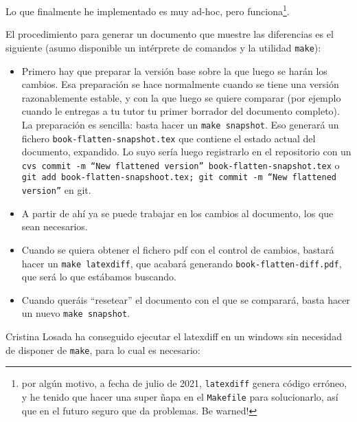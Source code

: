 Lo que finalmente he implementado es muy ad-hoc, pero funciona\footnote{por algún motivo, a fecha de julio de 2021, \texttt{latexdiff} genera código erróneo, y he tenido que hacer una super ñapa en el \texttt{Makefile} para solucionarlo, así que en el futuro seguro que da problemas. Be warned!}.

El procedimiento para generar un documento que muestre las diferencias es el siguiente (asumo disponible un intérprete de comandos y la utilidad \texttt{make}):

\begin{itemize}
  \item Primero hay que preparar la versión base sobre la que luego se harán los cambios. Esa preparación se hace normalmente cuando se tiene una versión razonablemente estable, y con la que luego se quiere comparar (por ejemplo cuando le entregas a tu tutor tu primer borrador del documento completo). La preparación es sencilla: basta hacer un \texttt{make snapshot}. Eso generará un fichero \texttt{book-flatten-snapshot.tex} que contiene el estado actual del documento, expandido. Lo suyo sería luego registrarlo en el repositorio con un \texttt{cvs commit -m ``New flattened version'' book-flatten-snapshot.tex} o \texttt{git add book-flatten-snapshoot.tex; git commit -m ``New flattened version''} en git.
  \item A partir de ahí ya se puede trabajar en los cambios al documento, los que sean necesarios.
  \item Cuando se quiera obtener el fichero pdf con el control de cambios, bastará hacer un \texttt{make latexdiff}, que acabará generando \texttt{book-flatten-diff.pdf}, que será lo que estábamos buscando.
  
  \item Cuando queráis ``resetear'' el documento con el que se comparará, basta hacer un nuevo \texttt{make snapshot}.
\end{itemize}

Cristina Losada ha conseguido ejecutar el latexdiff en un windows sin necesidad de disponer de \texttt{make}, para lo cual es necesario:

